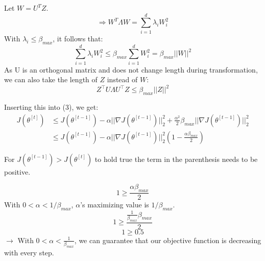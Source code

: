 \begin{answer}
Let $W=U^T Z$.
\[
\Rightarrow W^T \Lambda W = \sum_{i=1}^{d} \lambda_i W_i^2
\]
With $\lambda_i \le \beta_{max}$, it follows that:
\[
    \sum_{i=1}^{d} \lambda_i W_i^2 \le \beta_{max} \sum_{i=1}^{d} W_i^2 = \beta_{max} ||W||^2
\]
As U is an orthogonal matrix and does not change length during transformation, we can also take the length of $Z$ instead of $W$:
\[
    Z^\top U \Lambda U^\top Z \le \beta_{max} ||Z||^2
\]

Inserting this into (3), we get:
\begin{align} \label{eq:4}
J(\theta^{[t]}) &\le J(\theta^{[t-1]}) - \alpha ||\nabla J(\theta^{[t-1]})||_2^2 + \frac{\alpha^2}{2} \beta_{max} ||\nabla J(\theta^{[t-1]})||_2^2 \\
&\le J(\theta^{[t-1]}) - \alpha ||\nabla J(\theta^{[t-1]})||_2^2 \left(1 - \frac{\alpha \beta_{max}}{2}\right) \nonumber
\end{align}

For $J(\theta^{[t-1]}) > J(\theta^{[t]})$ to hold true the term in the parenthesis needs to be positive.

\begin{equation}
1 \ge \frac{\alpha \beta_{max}}{2}
\end{equation}
With $0 < \alpha < 1/\beta_{max}$, $\alpha$'s maximizing value is $1/\beta_{max}$.
\[
1 \ge \frac{\frac{1}{\beta_{max}} \beta_{max}}{2}
\]
\[
1 \ge 0.5
\]
$\rightarrow$ With $0 < \alpha < \frac{1}{\beta_{max}}$, we can guarantee that our objective function is decreasing with every step.

\end{answer}
